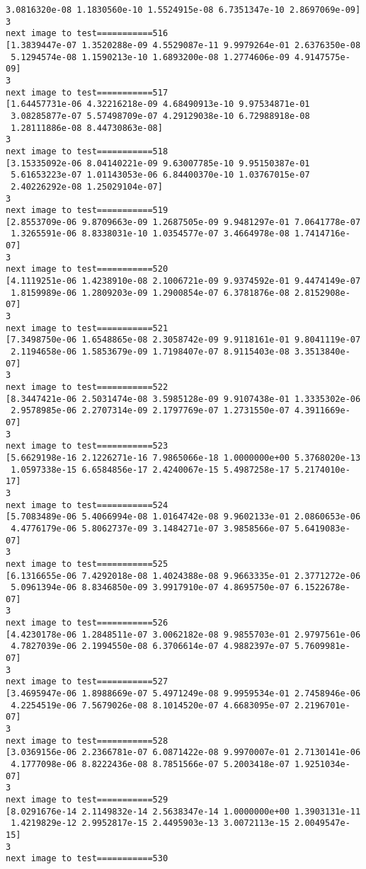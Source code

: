 \documentclass[11pt]{article}
\begin{document}
\begin{Verbatim}[commandchars=\\\{\}]
 3.0816320e-08 1.1830560e-10 1.5524915e-08 6.7351347e-10 2.8697069e-09]
3
next image to test===========516
[1.3839447e-07 1.3520288e-09 4.5529087e-11 9.9979264e-01 2.6376350e-08
 5.1294574e-08 1.1590213e-10 1.6893200e-08 1.2774606e-09 4.9147575e-09]
3
next image to test===========517
[1.64457731e-06 4.32216218e-09 4.68490913e-10 9.97534871e-01
 3.08285877e-07 5.57498709e-07 4.29129038e-10 6.72988918e-08
 1.28111886e-08 8.44730863e-08]
3
next image to test===========518
[3.15335092e-06 8.04140221e-09 9.63007785e-10 9.95150387e-01
 5.61653223e-07 1.01143053e-06 6.84400370e-10 1.03767015e-07
 2.40226292e-08 1.25029104e-07]
3
next image to test===========519
[2.8553709e-06 9.8709663e-09 1.2687505e-09 9.9481297e-01 7.0641778e-07
 1.3265591e-06 8.8338031e-10 1.0354577e-07 3.4664978e-08 1.7414716e-07]
3
next image to test===========520
[4.1119251e-06 1.4238910e-08 2.1006721e-09 9.9374592e-01 9.4474149e-07
 1.8159989e-06 1.2809203e-09 1.2900854e-07 6.3781876e-08 2.8152908e-07]
3
next image to test===========521
[7.3498750e-06 1.6548865e-08 2.3058742e-09 9.9118161e-01 9.8041119e-07
 2.1194658e-06 1.5853679e-09 1.7198407e-07 8.9115403e-08 3.3513840e-07]
3
next image to test===========522
[8.3447421e-06 2.5031474e-08 3.5985128e-09 9.9107438e-01 1.3335302e-06
 2.9578985e-06 2.2707314e-09 2.1797769e-07 1.2731550e-07 4.3911669e-07]
3
next image to test===========523
[5.6629198e-16 2.1226271e-16 7.9865066e-18 1.0000000e+00 5.3768020e-13
 1.0597338e-15 6.6584856e-17 2.4240067e-15 5.4987258e-17 5.2174010e-17]
3
next image to test===========524
[5.7083489e-06 5.4066994e-08 1.0164742e-08 9.9602133e-01 2.0860653e-06
 4.4776179e-06 5.8062737e-09 3.1484271e-07 3.9858566e-07 5.6419083e-07]
3
next image to test===========525
[6.1316655e-06 7.4292018e-08 1.4024388e-08 9.9663335e-01 2.3771272e-06
 5.0961394e-06 8.8346850e-09 3.9917910e-07 4.8695750e-07 6.1522678e-07]
3
next image to test===========526
[4.4230178e-06 1.2848511e-07 3.0062182e-08 9.9855703e-01 2.9797561e-06
 4.7827039e-06 2.1994550e-08 6.3706614e-07 4.9882397e-07 5.7609981e-07]
3
next image to test===========527
[3.4695947e-06 1.8988669e-07 5.4971249e-08 9.9959534e-01 2.7458946e-06
 4.2254519e-06 7.5679026e-08 8.1014520e-07 4.6683095e-07 2.2196701e-07]
3
next image to test===========528
[3.0369156e-06 2.2366781e-07 6.0871422e-08 9.9970007e-01 2.7130141e-06
 4.1777098e-06 8.8222436e-08 8.7851566e-07 5.2003418e-07 1.9251034e-07]
3
next image to test===========529
[8.0291676e-14 2.1149832e-14 2.5638347e-14 1.0000000e+00 1.3903131e-11
 1.4219829e-12 2.9952817e-15 2.4495903e-13 3.0072113e-15 2.0049547e-15]
3
next image to test===========530

\end{Verbatim}
\end{document}
